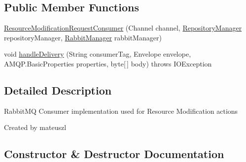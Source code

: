 \subsection*{Public Member Functions}
\begin{DoxyCompactItemize}
\item 
\hyperlink{classeu_1_1h2020_1_1symbiote_1_1messaging_1_1ResourceModificationRequestConsumer_a9edfd7dcca58ed1988bd26d9dd913191}{Resource\+Modification\+Request\+Consumer} (Channel channel, \hyperlink{classeu_1_1h2020_1_1symbiote_1_1repository_1_1RepositoryManager}{Repository\+Manager} repository\+Manager, \hyperlink{classeu_1_1h2020_1_1symbiote_1_1messaging_1_1RabbitManager}{Rabbit\+Manager} rabbit\+Manager)
\item 
void \hyperlink{classeu_1_1h2020_1_1symbiote_1_1messaging_1_1ResourceModificationRequestConsumer_a814265326818232c50a1b91a4b6e347b}{handle\+Delivery} (String consumer\+Tag, Envelope envelope, A\+M\+Q\+P.\+Basic\+Properties properties, byte\mbox{[}$\,$\mbox{]} body)  throws I\+O\+Exception 
\end{DoxyCompactItemize}


\subsection{Detailed Description}
Rabbit\+MQ Consumer implementation used for Resource Modification actions

Created by mateuszl 

\subsection{Constructor \& Destructor Documentation}
